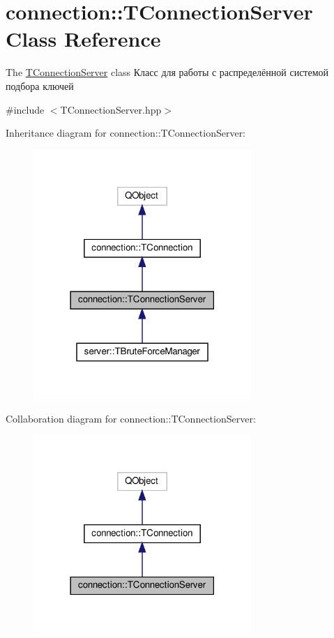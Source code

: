 \hypertarget{classconnection_1_1_t_connection_server}{}\section{connection\+:\+:T\+Connection\+Server Class Reference}
\label{classconnection_1_1_t_connection_server}


The \hyperlink{classconnection_1_1_t_connection_server}{T\+Connection\+Server} class Класс для работы с распределённой системой подбора ключей  




{\ttfamily \#include $<$T\+Connection\+Server.\+hpp$>$}



Inheritance diagram for connection\+:\+:T\+Connection\+Server\+:\nopagebreak
\begin{figure}[H]
\begin{center}
\leavevmode
\includegraphics[width=234pt]{classconnection_1_1_t_connection_server__inherit__graph}
\end{center}
\end{figure}


Collaboration diagram for connection\+:\+:T\+Connection\+Server\+:\nopagebreak
\begin{figure}[H]
\begin{center}
\leavevmode
\includegraphics[width=234pt]{classconnection_1_1_t_connection_server__coll__graph}
\end{center}
\end{figure}
